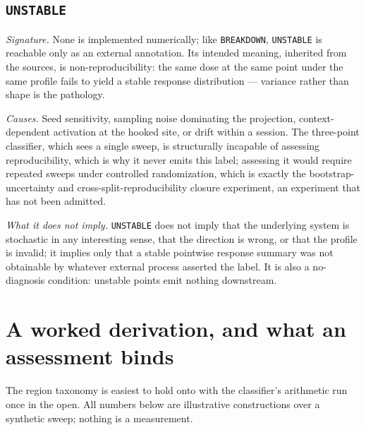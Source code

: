 \subsection{\texttt{UNSTABLE}}\label{ch07:sec:region-unstable}

\emph{Signature.} None is implemented numerically; like \texttt{BREAKDOWN},
\texttt{UNSTABLE} is reachable only as an external annotation. Its intended
meaning, inherited from the sources, is non-reproducibility: the same dose at
the same point under the same profile fails to yield a stable response
distribution --- variance rather than shape is the pathology.

\emph{Causes.} Seed sensitivity, sampling noise dominating the projection,
context-dependent activation at the hooked site, or drift within a session.
The three-point classifier, which sees a single sweep, is structurally
incapable of assessing reproducibility, which is why it never emits this
label; assessing it would require repeated sweeps under controlled
randomization, which is exactly the bootstrap-uncertainty and
cross-split-reproducibility closure experiment, an experiment that
has not been admitted.

\emph{What it does not imply.} \texttt{UNSTABLE} does not imply that the
underlying system is stochastic in any interesting sense, that the direction
is wrong, or that the profile is invalid; it implies only that a stable
pointwise response summary was not obtainable by whatever external process
asserted the label. It is also a no-diagnosis condition: unstable points
emit nothing downstream.

\section{A worked derivation, and what an assessment binds}\label{ch07:sec:worked}

The region taxonomy is easiest to hold onto with the classifier's
arithmetic run once in the open. All numbers below are illustrative
constructions over a synthetic sweep; nothing is a measurement.

